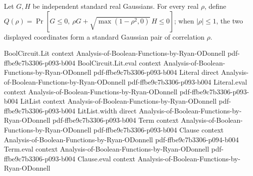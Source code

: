 \begin{definition}
\leanok
{}
Let $G,H$ be independent standard real Gaussians. For every real $\rho$, define $Q(\rho)=\Pr[G\le0,\ \rho G+\sqrt{\max(1-\rho^2,0)}\,H\le0]$; when $|\rho|\le1$, the two displayed coordinates form a standard Gaussian pair of correlation $\rho$.
\end{definition}

\begin{theorem}
\leanok
{}
\proofstep
  {BoolCircuit.Lit}
  {context}
  {Analysis-of-Boolean-Functions-by-Ryan-ODonnell}
  {pdf-ffbe9c7b3306-p093-b004}
\proofstep
  {BoolCircuit.Lit.eval}
  {context}
  {Analysis-of-Boolean-Functions-by-Ryan-ODonnell}
  {pdf-ffbe9c7b3306-p093-b004}
\proofstep
  {Literal}
  {direct}
  {Analysis-of-Boolean-Functions-by-Ryan-ODonnell}
  {pdf-ffbe9c7b3306-p093-b004}
\proofstep
  {Literal.eval}
  {context}
  {Analysis-of-Boolean-Functions-by-Ryan-ODonnell}
  {pdf-ffbe9c7b3306-p093-b004}
\proofstep
  {LitList}
  {context}
  {Analysis-of-Boolean-Functions-by-Ryan-ODonnell}
  {pdf-ffbe9c7b3306-p093-b004}
\proofstep
  {LitList.width}
  {direct}
  {Analysis-of-Boolean-Functions-by-Ryan-ODonnell}
  {pdf-ffbe9c7b3306-p093-b004}
\proofstep
  {Term}
  {context}
  {Analysis-of-Boolean-Functions-by-Ryan-ODonnell}
  {pdf-ffbe9c7b3306-p093-b004}
\proofstep
  {Clause}
  {context}
  {Analysis-of-Boolean-Functions-by-Ryan-ODonnell}
  {pdf-ffbe9c7b3306-p094-b004}
\proofstep
  {Term.eval}
  {context}
  {Analysis-of-Boolean-Functions-by-Ryan-ODonnell}
  {pdf-ffbe9c7b3306-p093-b004}
\proofstep
  {Clause.eval}
  {context}
  {Analysis-of-Boolean-Functions-by-Ryan-ODonnell}

\end{theorem}
